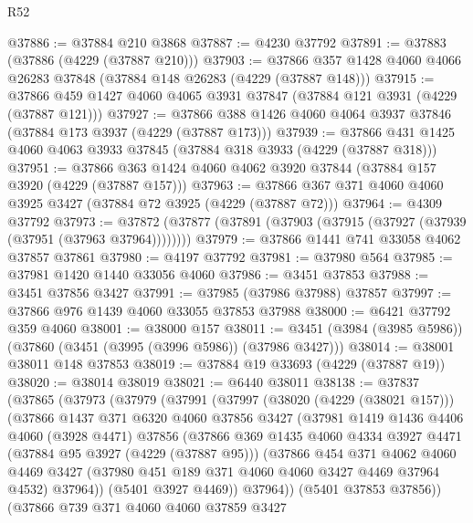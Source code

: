 \begin{lexlean}{R52}
\begin{coremodule}
@37886 := @37884 @210 @3868
@37887 := @4230 @37792
@37891 := @37883 (@37886 (@4229 (@37887 @210)))
@37903 := @37866 @357 @1428 @4060 @4066 @26283 @37848 (@37884 @148 @26283 (@4229 (@37887 @148)))
@37915 := @37866 @459 @1427 @4060 @4065 @3931 @37847 (@37884 @121 @3931 (@4229 (@37887 @121)))
@37927 := @37866 @388 @1426 @4060 @4064 @3937 @37846 (@37884 @173 @3937 (@4229 (@37887 @173)))
@37939 := @37866 @431 @1425 @4060 @4063 @3933 @37845 (@37884 @318 @3933 (@4229 (@37887 @318)))
@37951 := @37866 @363 @1424 @4060 @4062 @3920 @37844 (@37884 @157 @3920 (@4229 (@37887 @157)))
@37963 := @37866 @367 @371 @4060 @4060 @3925 @3427 (@37884 @72 @3925 (@4229 (@37887 @72)))
@37964 := @4309 @37792
@37973 := @37872 (@37877 (@37891 (@37903 (@37915 (@37927 (@37939 (@37951 (@37963 @37964))))))))
@37979 := @37866 @1441 @741 @33058 @4062 @37857 @37861
@37980 := @4197 @37792
@37981 := @37980 @564
@37985 := @37981 @1420 @1440 @33056 @4060
@37986 := @3451 @37853
@37988 := @3451 @37856 @3427
@37991 := @37985 (@37986 @37988) @37857
@37997 := @37866 @976 @1439 @4060 @33055 @37853 @37988
@38000 := @6421 @37792 @359 @4060
@38001 := @38000 @157
@38011 := @3451 (@3984 (@3985 @5986)) (@37860 (@3451 (@3995 (@3996 @5986)) (@37986 @3427)))
@38014 := @38001 @38011 @148 @37853
@38019 := @37884 @19 @33693 (@4229 (@37887 @19))
@38020 := @38014 @38019
@38021 := @6440 @38011
@38138 := @37837
    (@37865
      (@37973
        (@37979
          (@37991
            (@37997
              (@38020 (@4229 (@38021 @157)))
              (@37866
                @1437
                @371
                @6320
                @4060
                @37856
                @3427
                (@37981
                  @1419
                  @1436
                  @4406
                  @4060
                  (@3928 @4471)
                  @37856
                  (@37866
                    @369
                    @1435
                    @4060
                    @4334
                    @3927
                    @4471
                    (@37884 @95 @3927 (@4229 (@37887 @95)))
                    (@37866
                      @454
                      @371
                      @4062
                      @4060
                      @4469
                      @3427
                      (@37980 @451 @189 @371 @4060 @4060 @3427 @4469 @37964 @4532)
                      @37964))
                  (@5401 @3927 @4469))
                @37964))
            (@5401 @37853 @37856))
          (@37866
            @739
            @371
            @4060
            @4060
            @37859
            @3427

\end{coremodule}
\end{lexlean}
